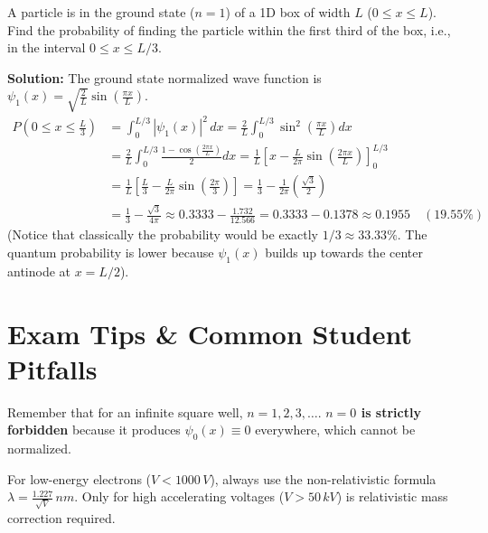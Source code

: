 \begin{example}
A particle is in the ground state ($n=1$) of a 1D box of width $L$ ($0 \le x \le L$). Find the probability of finding the particle within the first third of the box, i.e., in the interval $0 \le x \le L/3$.

\textbf{Solution:}
The ground state normalized wave function is $\psi_1(x) = \sqrt{\frac{2}{L}}\sin\left(\frac{\pi x}{L}\right)$.
\begin{align*}
    P\left(0 \le x \le \frac{L}{3}\right) &= \int_0^{L/3} |\psi_1(x)|^2\,dx = \frac{2}{L}\int_0^{L/3} \sin^2\left(\frac{\pi x}{L}\right)dx \\
    &= \frac{2}{L}\int_0^{L/3} \frac{1 - \cos\left(\frac{2\pi x}{L}\right)}{2}dx = \frac{1}{L}\left[ x - \frac{L}{2\pi}\sin\left(\frac{2\pi x}{L}\right) \right]_0^{L/3} \\
    &= \frac{1}{L}\left[ \frac{L}{3} - \frac{L}{2\pi}\sin\left(\frac{2\pi}{3}\right) \right] = \frac{1}{3} - \frac{1}{2\pi}\left(\frac{\sqrt{3}}{2}\right) \\
    &= \frac{1}{3} - \frac{\sqrt{3}}{4\pi} \approx 0.3333 - \frac{1.732}{12.566} = 0.3333 - 0.1378 \approx 0.1955 \quad (19.55\%)
\end{align*}
(Notice that classically the probability would be exactly $1/3 \approx 33.33\%$. The quantum probability is lower because $\psi_1(x)$ builds up towards the center antinode at $x = L/2$).
\end{example}

\section{Exam Tips \& Common Student Pitfalls}

\begin{examtip}
Remember that for an infinite square well, $n = 1, 2, 3, \dots$. \textbf{$n=0$ is strictly forbidden} because it produces $\psi_0(x) \equiv 0$ everywhere, which cannot be normalized.
\end{examtip}

\begin{commonmistake}
For low-energy electrons ($V < 1000\,\si{V}$), always use the non-relativistic formula $\lambda = \frac{1.227}{\sqrt{V}}\,\si{nm}$. Only for high accelerating voltages ($V > 50\,\si{kV}$) is relativistic mass correction required.
\end{commonmistake}

